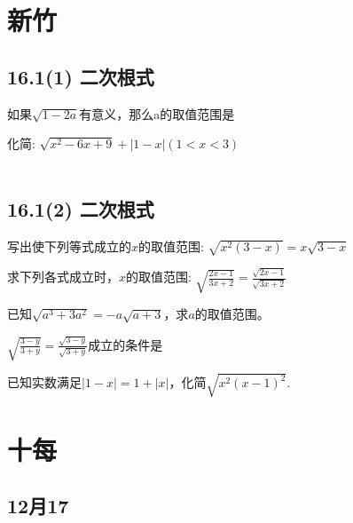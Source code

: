 \documentclass[answers]{exam} %
\begin{document}
\section{新竹}

\subsection{16.1(1) 二次根式}

\begin{questions}

\question 如果$\sqrt{1-2a}$有意义，那么a的取值范围是\underline{\quad\quad}

\question 化简: $\sqrt{x^2-6x+9} + \left| 1-x \right| (1<x<3)$
  ~\\
  ~\\

\end{questions}

\subsection{16.1(2) 二次根式}

\begin{questions}

  \question
  写出使下列等式成立的$x$的取值范围: $\sqrt{x^2(3-x)}=x \sqrt{3-x}$

  \question
  求下列各式成立时，$x$的取值范围: $\sqrt{\frac{2x-1}{3x+2}}=\frac{\sqrt{2x-1}}{\sqrt{3x+2}}$
  
  \question
  已知$\sqrt{a^3+3a^2}=-a\sqrt{a+3}$，求$a$的取值范围。

  \question
  $\sqrt{\frac{3-y}{3+y}}=\frac{\sqrt{3-y}}{\sqrt{3+y}}$成立的条件是\underline{\quad\quad}

\question 已知实数满足$|1-x|=1+|x|$，化简$\sqrt{x^2(x-1)^2}$.

\end{questions}

\section{十每}

\subsection{12月17}
\end{document}
